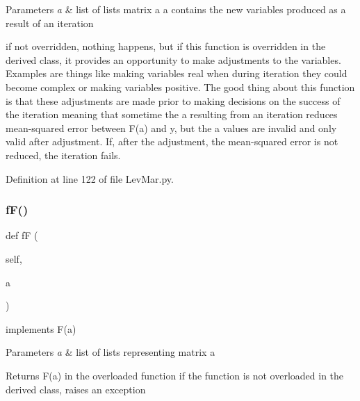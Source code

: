 \begin{DoxyParams}{Parameters}
{\em a} & list of lists matrix a a contains the new variables produced as a result of an iteration\\
\hline
\end{DoxyParams}
if not overridden, nothing happens, but if this function is overridden in the derived class, it provides an opportunity to make adjustments to the variables. Examples are things like making variables real when during iteration they could become complex or making variables positive. The good thing about this function is that these adjustments are made prior to making decisions on the success of the iteration meaning that sometime the a resulting from an iteration reduces mean-\/squared error between F(a) and y, but the a values are invalid and only valid after adjustment. If, after the adjustment, the mean-\/squared error is not reduced, the iteration fails. 

Definition at line 122 of file Lev\+Mar.\+py.

\mbox{\label{classSignalIntegrity_1_1Fit_1_1LevMar_1_1LevMar_a4657ab652abd49c90e9541299fa5e9d8}} 
\subsubsection{\texorpdfstring{f\+F()}{fF()}}
{\footnotesize\ttfamily def fF (\begin{DoxyParamCaption}\item[{}]{self,  }\item[{}]{a }\end{DoxyParamCaption})}



implements F(a) 


\begin{DoxyParams}{Parameters}
{\em a} & list of lists representing matrix a \\
\hline
\end{DoxyParams}
\begin{DoxyReturn}{Returns}
F(a) in the overloaded function if the function is not overloaded in the derived class, raises an exception 
\end{DoxyReturn}

